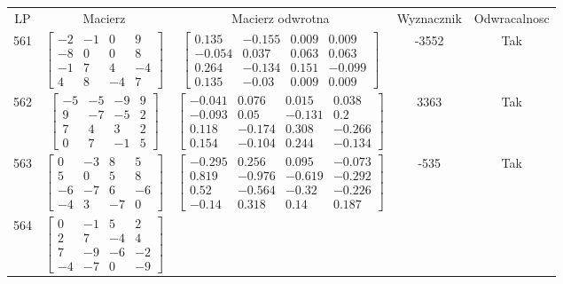 \documentclass[a4paper,12pt]{article}
\begin{document}
\bgroup {} \vspace{0.2in} \begin{tabular}{c c c c c}
LP & Macierz & Macierz odwrotna & Wyznacznik & Odwracalnosc\\
561
&
$\begin{bmatrix} -2 & -1 & 0 & 9 \\ -8 & 0 & 0 & 8 \\ -1 & 7 & 4 & -4 \\ 4 & 8 & -4 & 7 \end{bmatrix}$
&
$\begin{bmatrix} 0.135 & -0.155 & 0.009 & 0.009 \\ -0.054 & 0.037 & 0.063 & 0.063 \\ 0.264 & -0.134 & 0.151 & -0.099 \\ 0.135 & -0.03 & 0.009 & 0.009 \end{bmatrix}$
&
-3552
&
Tak
\\
562
&
$\begin{bmatrix} -5 & -5 & -9 & 9 \\ 9 & -7 & -5 & 2 \\ 7 & 4 & 3 & 2 \\ 0 & 7 & -1 & 5 \end{bmatrix}$
&
$\begin{bmatrix} -0.041 & 0.076 & 0.015 & 0.038 \\ -0.093 & 0.05 & -0.131 & 0.2 \\ 0.118 & -0.174 & 0.308 & -0.266 \\ 0.154 & -0.104 & 0.244 & -0.134 \end{bmatrix}$
&
3363
&
Tak
\\
563
&
$\begin{bmatrix} 0 & -3 & 8 & 5 \\ 5 & 0 & 5 & 8 \\ -6 & -7 & 6 & -6 \\ -4 & 3 & -7 & 0 \end{bmatrix}$
&
$\begin{bmatrix} -0.295 & 0.256 & 0.095 & -0.073 \\ 0.819 & -0.976 & -0.619 & -0.292 \\ 0.52 & -0.564 & -0.32 & -0.226 \\ -0.14 & 0.318 & 0.14 & 0.187 \end{bmatrix}$
&
-535
&
Tak
\\
564
&
$\begin{bmatrix} 0 & -1 & 5 & 2 \\ 2 & 7 & -4 & 4 \\ 7 & -9 & -6 & -2 \\ -4 & -7 & 0 & -9 \end{bmatrix}$

\end{tabular}
\end{document}

